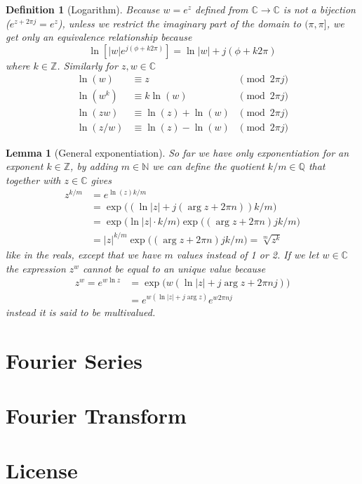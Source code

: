\documentclass[twocolumn, margin=normal]{tex/hsrzf}
\newcommand\Nset{\mathbb{N}}
\newcommand\Zset{\mathbb{Z}}
\newcommand\Qset{\mathbb{Q}}
\newcommand\Cset{\mathbb{C}}
\newcommand\len[1]{\lvert#1\rvert}
\theoremstyle{komfourzf}
\newtheorem{definition}{Definition}
\newtheorem{lemma}{Lemma}
\begin{document}
\begin{definition}[Logarithm]
  Because \(w = e^z\) defined from \(\Cset \to \Cset\) is not a bijection (\(e^{z + 2\pi j} = e^z\)), unless we restrict the imaginary part of the domain to \((\pi, \pi]\), we get only an equivalence relationship because
  \[
    \ln\left[\len{w} e^{j(\phi + k2\pi)}\right] = \ln\len{w} + j(\phi + k2\pi)
  \]
  where \(k \in\Zset\). Similarly for \(z,w\in\Cset\)
  \begin{align*}
    \ln(w) &\equiv z &\pmod{2\pi j} \\
    \ln(w^k) &\equiv k\ln(w) &\pmod{2\pi j} \\
    \ln(zw) &\equiv \ln(z) + \ln(w) &\pmod{2\pi j} \\
    \ln(z/w) &\equiv \ln(z) - \ln(w) &\pmod{2\pi j}
  \end{align*}
\end{definition}

\begin{lemma}[General exponentiation]
  So far we have only exponentiation for an exponent \(k\in\Zset\), by adding \(m \in\Nset\) we can define the quotient \(k/m \in\Qset\) that together with \(z\in\Cset\) gives
  \begin{align*}
    z^{k/m} &= e^{\ln(z) k/m} \\
    &= \exp\big((\ln\len{z} + j(\arg z + 2\pi n)) k/m\big) \\
    &= \exp\big(\ln\len{z}\cdot k/m)\exp((\arg z + 2\pi n)jk/m\big) \\
    &= \len{z}^{k/m}\exp\big((\arg z + 2\pi n)jk/m\big)= \sqrt[m]{z^k}
  \end{align*}
  like in the reals, except that we have \(m\) values instead of 1 or 2. If we let \(w \in\Cset\) the expression \(z^w\) cannot be equal to an unique value because
  \begin{align*}
    z^w = e^{w \ln z} &= \exp\big( w (\ln\len{z} + j \arg{z} + 2\pi nj)\big) \\
    &= e^{w(\ln\len{z} + j\arg z)} e^{w2\pi nj}
  \end{align*}
  instead it is said to be \emph{multivalued}.
\end{lemma}

\section{Fourier Series}

\section{Fourier Transform}

\section{License}
\doclicenseThis
\end{document}
